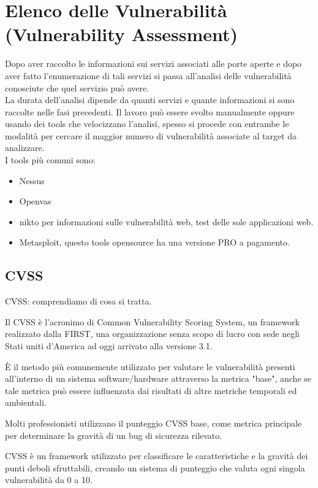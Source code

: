 \documentclass[a4paper,12pt]{article}
\begin{document}
\section{ Elenco delle Vulnerabilità (Vulnerability Assessment) }

Dopo aver raccolto le informazioni sui servizi associati alle porte aperte e dopo aver fatto l'enumerazione di tali servizi si passa all'analisi delle vulnerabilità conosciute che quel servizio può avere.\\
La durata dell'analisi dipende da quanti servizi e quante informazioni si sono raccolte nelle fasi precedenti.
Il lavoro può essere svolto manualmente oppure usando dei tools che velocizzano l'analisi, spesso si procede con entrambe le modalità per cercare il maggior numero di vulnerabilità associate al target da analizzare. \\
I tools più comuni sono:
\begin{itemize}
   
  \item Nessus\cite{nessus}
  \item Openvas \cite{openvas}
  \item nikto\cite{nikto} per informazioni sulle vulnerabilità web, test delle sole applicazioni web.
  \item Metasploit\cite{metasploit}, questo tools opensource ha una versione PRO a pagamento.
\end{itemize}

\subsection{CVSS}

CVSS: comprendiamo di cosa si tratta.

Il CVSS\cite{CVSS} è l’acronimo di Common Vulnerability Scoring System, un framework realizzato dalla FIRST\cite{First}, una organizzazione senza scopo di lucro con sede negli Stati uniti d’America ad oggi arrivato alla versione 3.1.

È il metodo più comunemente utilizzato per valutare le vulnerabilità presenti all'interno di un sistema software/hardware attraverso la metrica "base", anche se tale metrica può essere influenzata dai risultati di altre metriche temporali ed ambientali.

Molti professionisti utilizzano il punteggio CVSS base, come metrica principale per determinare la gravità di un bug di sicurezza rilevato. 

CVSS è un framework utilizzato per classificare le caratteristiche e la gravità dei punti deboli sfruttabili, creando un sistema di punteggio che valuta ogni singola vulnerabilità da 0 a 10.
\end{document}
